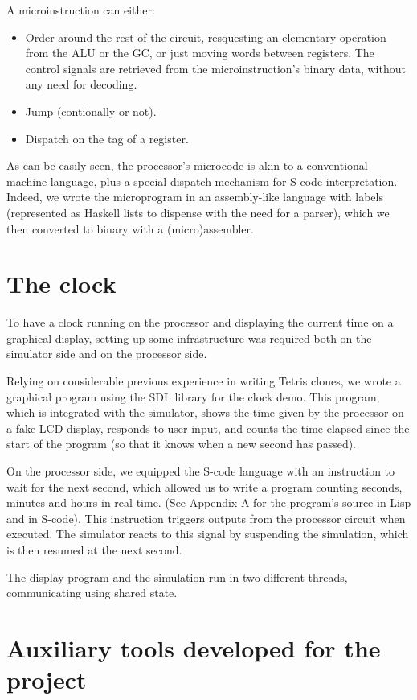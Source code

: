 \documentclass[a4paper, 11pt]{article}
\begin{document}
A microinstruction can either:
\begin{itemize}
\item Order around the rest of the circuit, resquesting an elementary operation from the ALU or the GC, or just moving words between registers. The control signals are retrieved from the microinstruction's binary data, without any need for decoding.
\item Jump (contionally or not). 
\item Dispatch on the tag of a register.
\end{itemize}
As can be easily seen, the processor's microcode is akin to a conventional machine language, plus a special dispatch mechanism for S-code interpretation. Indeed, we wrote the microprogram in an assembly-like language with labels (represented as Haskell lists to dispense with the need for a parser), which we then converted to binary with a (micro)assembler.


\section{The clock}

To have a clock running on the processor and displaying the current time on a graphical display, setting up some infrastructure was required both on the simulator side and on the processor side.

Relying on considerable previous experience in writing Tetris clones, we wrote a graphical program using the SDL library for the clock demo. This program, which is integrated with the simulator, shows the time given by the processor on a fake LCD display, responds to user input, and counts the time elapsed since the start of the program (so that it knows when a new second has passed). 

On the processor side, we equipped the S-code language with an instruction to wait for the next second, which allowed us to write a program counting seconds, minutes and hours in real-time. (See Appendix A for the program's source in Lisp and in S-code). This instruction triggers outputs from the processor circuit when executed. The simulator reacts to this signal by suspending the simulation, which is then resumed at the next second. 

The display program and the simulation run in two different threads, communicating using shared state.


\section{Auxiliary tools developed for the project}
\end{document}
